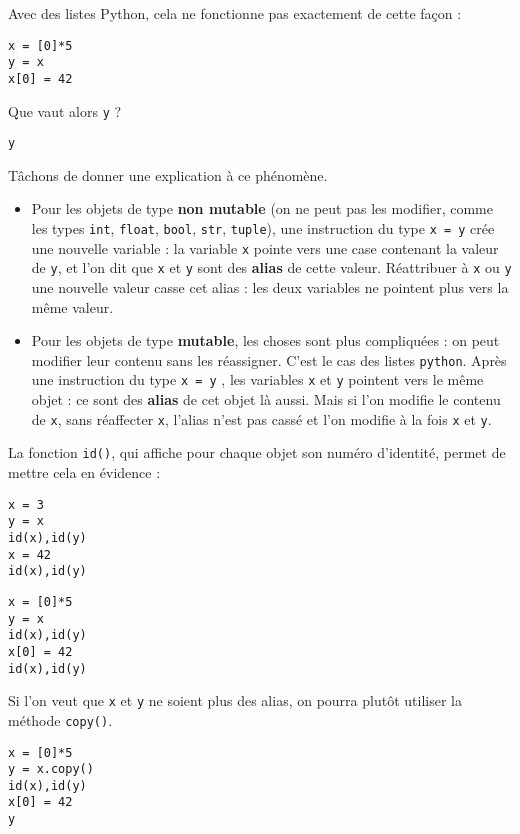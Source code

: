 Avec des listes Python, cela ne fonctionne pas exactement de cette façon : 
\begin{lstlisting}
x = [0]*5
y = x
x[0] = 42
\end{lstlisting}
Que vaut alors \texttt{y} ? 
\begin{lstlisting}
y
\end{lstlisting}
Tâchons de donner une explication à ce phénomène.
\begin{itemize}
  \item Pour les objets de type \textbf{non mutable} (on ne peut pas les modifier, comme les types 
  \texttt{int}, \texttt{float}, \texttt{bool}, \texttt{str}, \texttt{tuple}), une instruction du type \texttt{x = y} 
crée une nouvelle variable : la variable \texttt{x} pointe vers une case contenant la valeur de 
\texttt{y}, et l'on dit que \texttt{x} et \texttt{y} sont des \textbf{alias} de cette valeur. Réattribuer à 
\texttt{x} ou \texttt{y} une nouvelle valeur casse cet alias : les deux variables ne pointent plus vers la 
même valeur.
  \item Pour les objets de type \textbf{mutable}, les choses sont plus compliquées : on peut modifier 
leur contenu sans les réassigner. C'est le cas des listes \texttt{python}. Après une instruction du type 
\texttt{x = y} , les variables \texttt{x} et \texttt{y} pointent vers le même objet : ce sont des 
\textbf{alias} de cet objet là aussi. Mais si l'on modifie le contenu de \texttt{x}, sans réaffecter 
\texttt{x}, l'alias n'est pas cassé et l'on modifie à la fois \texttt{x} et \texttt{y}.
\end{itemize}



La fonction \texttt{id()}, qui affiche pour chaque objet son \og numéro d'identité\fg, permet de 
mettre cela en évidence :
\begin{multicols}{2}
\begin{lstlisting}
x = 3
y = x
id(x),id(y)
x = 42
id(x),id(y)
\end{lstlisting}


\begin{lstlisting}
x = [0]*5
y = x
id(x),id(y)
x[0] = 42
id(x),id(y)
\end{lstlisting}

\end{multicols}
Si l'on veut que \texttt{x} et \texttt{y} ne soient plus des alias, on pourra plutôt utiliser la méthode 
\texttt{copy()}.

\begin{lstlisting}
x = [0]*5
y = x.copy()
id(x),id(y)
x[0] = 42
y
\end{lstlisting}

